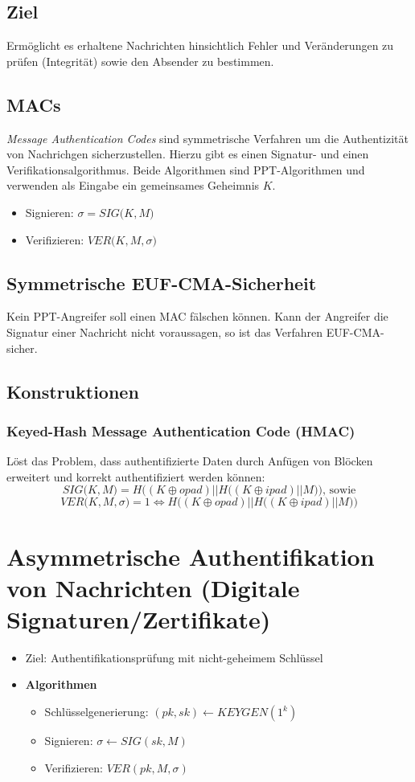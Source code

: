 \subsection{Ziel}
Ermöglicht es erhaltene Nachrichten hinsichtlich Fehler und Veränderungen zu prüfen (Integrität) sowie den Absender zu bestimmen.

\subsection{MACs}
\textit{Message Authentication Codes} sind symmetrische Verfahren um die Authentizität von Nachrichgen sicherzustellen. Hierzu gibt es einen Signatur- und einen Verifikationsalgorithmus. Beide Algorithmen sind PPT-Algorithmen und verwenden als Eingabe ein gemeinsames Geheimnis \(K\).
\begin{itemize}
	\item Signieren: \(\sigma = SIG\big(K,M\big)\)
	\item Verifizieren: \(VER\big(K,M,\sigma\big)\)
\end{itemize}


\subsection{Symmetrische EUF-CMA-Sicherheit}
Kein PPT-Angreifer soll einen MAC fälschen können. Kann der Angreifer die Signatur einer Nachricht nicht voraussagen, so ist das Verfahren EUF-CMA-sicher.


\subsection{Konstruktionen}

\subsubsection{Keyed-Hash Message Authentication Code (HMAC)}
Löst das Problem, dass authentifizierte Daten durch Anfügen von Blöcken erweitert und korrekt authentifiziert werden können:
\[SIG\big(K,M\big) = H\Big((K \oplus opad) || H\big((K \oplus ipad) || M\big)\Big)\text{, sowie}\]
\[VER\big(K,M,\sigma\big) = 1 \Leftrightarrow H\Big((K \oplus opad) || H\big((K \oplus ipad) || M\big)\Big)\]



\section{Asymmetrische Authentifikation von Nachrichten (Digitale Signaturen/Zertifikate)}
\begin{itemize}
	\item Ziel: Authentifikationsprüfung mit nicht-geheimem Schlüssel
	\item \textbf{Algorithmen}
	\begin{itemize}
		\item Schlüsselgenerierung: \((pk,sk) \leftarrow KEYGEN(1^k)\)
		\item Signieren: \(\sigma \leftarrow SIG(sk,M)\)
		\item Verifizieren: \(VER(pk,M,\sigma)\)
	\end{itemize}
\end{itemize}

